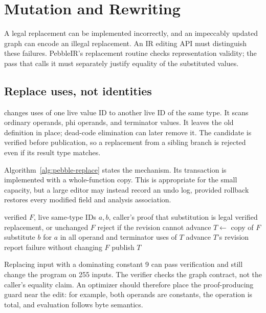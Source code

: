 \chapter{Mutation and Rewriting}
\label{ch:pebble-rewriting}

A legal replacement can be implemented incorrectly, and an impeccably updated graph can encode an illegal replacement.
An IR editing API must distinguish these failures.
PebbleIR's replacement routine checks representation validity; the pass that calls it must separately justify equality of the substituted values.

\section{Replace uses, not identities}
\label{sec:pebble-replace}
 changes uses of one live value ID to another live ID of the same type.
It scans ordinary operands, phi operands, and terminator values.
It leaves the old definition in place; dead-code elimination can later remove it.
The candidate is verified before publication, so a replacement from a sibling branch is rejected even if its result type matches.

Algorithm~\ref{alg:pebble-replace} states the mechanism.
Its transaction is implemented with a whole-function copy.
This is appropriate for the small capacity, but a large editor may instead record an undo log, provided rollback restores every modified field and analysis association.

\begin{algorithm}[htbp]
\caption{A structurally checked replace-all-uses operation.}
\label{alg:pebble-replace}
\begin{pseudocode}
\Require verified $F$, live same-type IDs $a,b$, caller's proof that substitution is legal
\Ensure verified replacement, or unchanged $F$
\State reject if the revision cannot advance
\State $T\gets$ copy of $F$
\State substitute $b$ for $a$ in all operand and terminator uses of $T$
\State advance $T$'s revision
\State report failure without changing $F$
\Else
\State publish $T$
\EndIf
\end{pseudocode}
\end{algorithm}

Replacing input  with a dominating constant 9 can pass verification and still change the program on 255 inputs.
The verifier checks the graph contract, not the caller's equality claim.
An optimizer should therefore place the proof-producing guard near the edit: for example, both operands are constants, the operation is total, and evaluation follows byte semantics.

